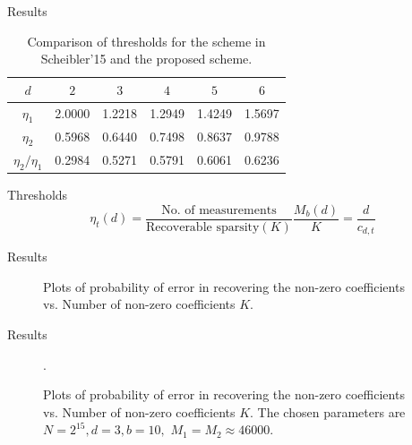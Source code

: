 \documentclass[10pt,xcolor=table]{beamer}
\begin{document}
\begin{frame}{Results}

 \begin{table}
	\centering
	\caption{Comparison of thresholds for the scheme in Scheibler'15 and the proposed scheme.}
	\label{table:thresholds}
	\begin{tabular}{|c|c|c|c|c|c|}
		\hline
		$d$ & $2$ & $3$ & $4$ & $5$ & $6$ \\
		\hline
		$\eta_1$ & 2.0000 &  1.2218 &   1.2949 &  1.4249  &  1.5697 \\
		\hline
		$\eta_2$ & 0.5968 &  0.6440 &  0.7498  &  0.8637  &  0.9788 \\
		\hline
		$\eta_2/\eta_1$ &    0.2984 &   0.5271  &  0.5791  &  0.6061  &  0.6236 \\
		\hline
	\end{tabular}
\end{table}

\begin{block}{Thresholds}
	\begin{equation*}
	\eta_t(d) = \frac{\text{No. of measurements}}{\text{Recoverable sparsity} (K)}  \frac{M_b(d)}{K} = \frac{d}{c_{d,t}}
	\end{equation*}
	
\end{block}

\end{frame}

\begin{frame}{Results}

\begin{center}
	\begin{figure}[h!]
		\resizebox{0.60\textwidth}{!}{}
		\caption{Plots of probability of error in recovering the non-zero coefficients vs. Number of non-zero coefficients $K$.} \label{Fig:Simulation Results}
	\end{figure}	
\end{center}

\end{frame}

\begin{frame}{Results}

		\begin{figure}[h!]
	
	\resizebox{0.60\textwidth}{!}{}
	
	\caption{Plots of probability of error in recovering the non-zero coefficients vs. Number of non-zero coefficients $K$. The chosen parameters are $N = 2^{15}, d=3, b=10,$ $M_1 = M_2 \approx 46000$.} \label{Fig:Simulation Results}.
\end{figure}

\end{frame}
\end{document}

